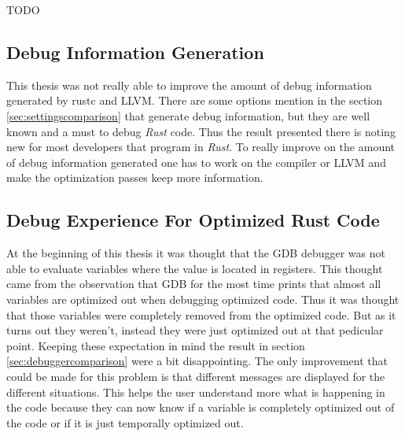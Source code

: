 

TODO

\subsection{Debug Information Generation}
This thesis was not really able to improve the amount of debug information generated by \gls{rustc} and \gls{LLVM}.
There are some options mention in the section \ref{sec:settingscomparison} that generate debug information, but they are well known and a must to debug \emph{Rust} code.
Thus the result presented there is noting new for most developers that program in \emph{Rust}.
To really improve on the amount of debug information generated one has to work on the compiler or \gls{LLVM} and make the optimization passes keep more information.


\subsection{Debug Experience For Optimized Rust Code}
At the beginning of this thesis it was thought that the \gls{GDB} debugger was not able to evaluate variables where the value is located in registers.
This thought came from the observation that \gls{GDB} for the most time prints that almost all variables are optimized out when debugging optimized code.
Thus it was thought that those variables were completely removed from the optimized code.
But as it turns out they weren't, instead they were just optimized out at that pedicular point.
Keeping these expectation in mind the result in section \ref{sec:debuggercomparison} were a bit disappointing.
The only improvement that could be made for this problem is that different messages are displayed for the different situations.
This helps the user understand more what is happening in the code because they can now know if a variable is completely optimized out of the code or if it is just temporally optimized out.


